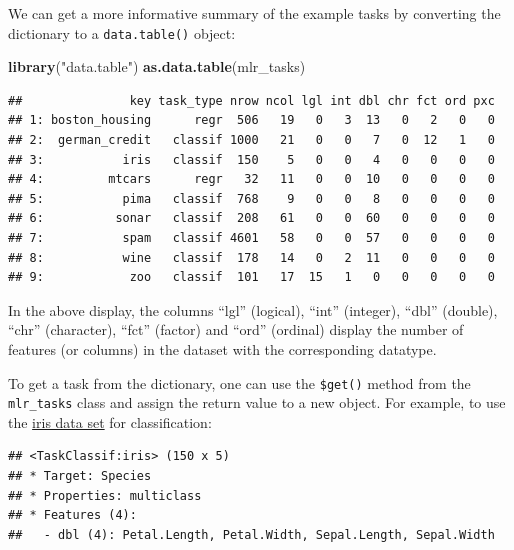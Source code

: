 \documentclass[]{scrbook}
\newenvironment{Shaded}{\begin{snugshade}}{\end{snugshade}}
\newcommand{\KeywordTok}[1]{\textcolor[rgb]{0.13,0.29,0.53}{\textbf{#1}}}
\newcommand{\NormalTok}[1]{#1}
\newcommand{\OperatorTok}[1]{\textcolor[rgb]{0.81,0.36,0.00}{\textbf{#1}}}
\newcommand{\StringTok}[1]{\textcolor[rgb]{0.31,0.60,0.02}{#1}}
\renewenvironment{Shaded} {\begin{snugshade}\small} {\end{snugshade}}
\begin{document}
We can get a more informative summary of the example tasks by converting the dictionary to a \texttt{data.table()} object:

\begin{Shaded}
\begin{Highlighting}[]
\KeywordTok{library}\NormalTok{(}\StringTok{"data.table"}\NormalTok{)}
\KeywordTok{as.data.table}\NormalTok{(mlr_tasks)}
\end{Highlighting}
\end{Shaded}

\begin{verbatim}
##               key task_type nrow ncol lgl int dbl chr fct ord pxc
## 1: boston_housing      regr  506   19   0   3  13   0   2   0   0
## 2:  german_credit   classif 1000   21   0   0   7   0  12   1   0
## 3:           iris   classif  150    5   0   0   4   0   0   0   0
## 4:         mtcars      regr   32   11   0   0  10   0   0   0   0
## 5:           pima   classif  768    9   0   0   8   0   0   0   0
## 6:          sonar   classif  208   61   0   0  60   0   0   0   0
## 7:           spam   classif 4601   58   0   0  57   0   0   0   0
## 8:           wine   classif  178   14   0   2  11   0   0   0   0
## 9:            zoo   classif  101   17  15   1   0   0   0   0   0
\end{verbatim}

In the above display, the columns ``lgl'' (logical), ``int'' (integer), ``dbl'' (double), ``chr'' (character), ``fct'' (factor) and ``ord'' (ordinal) display the number of features (or columns) in the dataset with the corresponding datatype.

To get a task from the dictionary, one can use the \texttt{\$get()} method from the \texttt{mlr\_tasks} class and assign the return value to a new object.
For example, to use the \href{https://en.wikipedia.org/wiki/Iris_flower_data_set}{iris data set} for classification:

\begin{Shaded}
\end{Shaded}

\begin{verbatim}
## <TaskClassif:iris> (150 x 5)
## * Target: Species
## * Properties: multiclass
## * Features (4):
##   - dbl (4): Petal.Length, Petal.Width, Sepal.Length, Sepal.Width
\end{verbatim}
\end{document}
